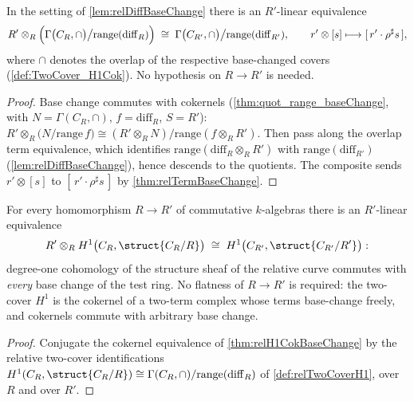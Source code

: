 \begin{theorem}
  \label{thm:relH1CokBaseChange}
  \leanok
  In the setting of \ref{lem:relDiffBaseChange} there is an \(R'\)-linear equivalence
  \[
    R' \otimes_R \Bigl(\Gamma\bigl(C_R, \cap\bigr)\big/\mathrm{range}(\mathrm{diff}_R)\Bigr)
    \;\cong\;
    \Gamma\bigl(C_{R'}, \cap\bigr)\big/\mathrm{range}(\mathrm{diff}_{R'}),
    \qquad r' \otimes [s] \longmapsto [\,r' \cdot \rho^{\sharp} s\,],
  \]
  where \(\cap\) denotes the overlap of the respective base-changed covers
  (\ref{def:TwoCover_H1Cok}). No hypothesis on \(R \to R'\) is needed.
\end{theorem}
\begin{proof}
  \leanok
  Base change commutes with cokernels (\ref{thm:quot_range_baseChange}, with
  \(N = \Gamma(C_R, \cap)\), \(f = \mathrm{diff}_R\), \(S = R'\)):
  \(R' \otimes_R \bigl(N/\mathrm{range}\,f\bigr) \cong (R' \otimes_R N)/
  \mathrm{range}(f \otimes_R R')\). Then pass along the overlap term equivalence, which
  identifies \(\mathrm{range}(\mathrm{diff}_R \otimes_R R')\) with
  \(\mathrm{range}(\mathrm{diff}_{R'})\) (\ref{lem:relDiffBaseChange}), hence descends to
  the quotients. The composite sends \(r' \otimes [s]\) to
  \([\,r' \cdot \rho^{\sharp} s\,]\) by \ref{thm:relTermBaseChange}.
\end{proof}

\begin{theorem}
  \label{thm:relH1BaseChange}
  \leanok
  For every homomorphism \(R \to R'\) of commutative \(k\)-algebras there is an
  \(R'\)-linear equivalence
  \[
    R' \otimes_R H^1\bigl(C_R, \struct{C_R/R}\bigr) \;\cong\;
      H^1\bigl(C_{R'}, \struct{C_{R'}/R'}\bigr) :
  \]
  degree-one cohomology of the structure sheaf of the relative curve commutes with
  \emph{every} base change of the test ring. No flatness of \(R \to R'\) is required:
  the two-cover \(H^1\) is the cokernel of a two-term complex whose terms base-change
  freely, and cokernels commute with arbitrary base change.
\end{theorem}
\begin{proof}
  \leanok
  Conjugate the cokernel equivalence of \ref{thm:relH1CokBaseChange} by the relative
  two-cover identifications \(H^1(C_R, \struct{C_R/R}) \cong
  \Gamma(C_R, \cap)/\mathrm{range}(\mathrm{diff}_R)\) of \ref{def:relTwoCoverH1}, over
  \(R\) and over \(R'\).
\end{proof}

